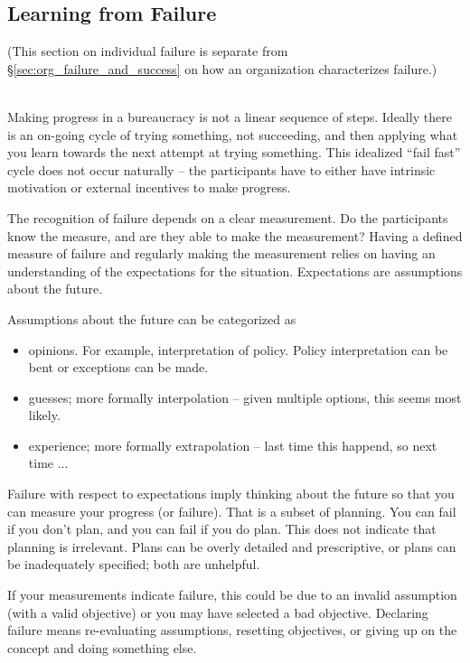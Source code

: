 \subsection{Learning from Failure\label{sec:learn_from_failure}}

(This section on individual failure is separate from \S\ref{sec:org_failure_and_success} on how an organization characterizes failure.)

\ \\

Making progress in a bureaucracy is not a linear sequence of steps. Ideally there is an on-going cycle of trying something, not succeeding, and then applying what you learn towards the next attempt at trying something. This idealized ``fail fast'' cycle does not occur naturally -- the participants have to either have intrinsic motivation or external incentives to make progress. 

The recognition of failure depends on a clear measurement. Do the participants know the measure, and are they able to make the measurement? Having a defined measure of failure and regularly making the measurement relies on having an understanding of the expectations for the situation. Expectations are assumptions about the future.

Assumptions about the future can be categorized as
\begin{itemize}
    \item opinions. For example, interpretation of policy. Policy interpretation can be bent or exceptions can be made. 
    \item guesses; more formally interpolation -- given multiple options, this seems most likely.
    \item experience; more formally extrapolation -- last time this happend, so next time ...
\end{itemize}

Failure with respect to expectations imply thinking about the future so that you can measure your progress (or failure). That is a subset of planning. You can fail if you don't plan, and you can fail if you do plan. This does not indicate that planning is irrelevant. Plans can be overly detailed and prescriptive, or plans can be inadequately specified; both are unhelpful.

If your measurements indicate failure, this could be due to an invalid assumption (with a valid objective) or you may have selected a bad objective. Declaring failure means re-evaluating assumptions, resetting objectives, or giving up on the concept and doing something else.

